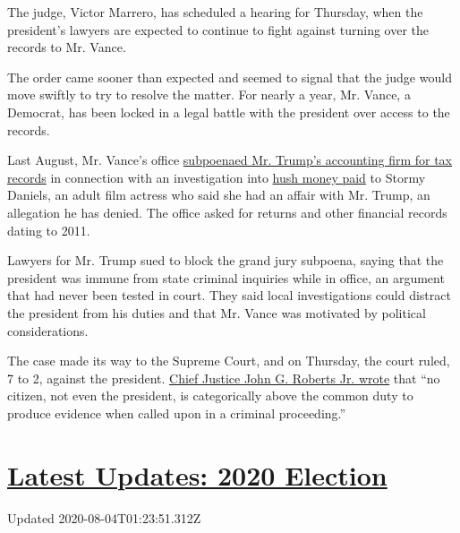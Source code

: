 The judge, Victor Marrero, has scheduled a hearing for Thursday, when
the president's lawyers are expected to continue to fight against
turning over the records to Mr. Vance.

The order came sooner than expected and seemed to signal that the judge
would move swiftly to try to resolve the matter. For nearly a year, Mr.
Vance, a Democrat, has been locked in a legal battle with the president
over access to the records.

Last August, Mr. Vance's office
\href{https://www.nytimes3xbfgragh.onion/2020/08/03/nyregion/donald-trump-taxes-cyrus-vance.html}{subpoenaed
Mr. Trump's accounting firm for tax records} in connection with an
investigation into
\href{https://www.nytimes3xbfgragh.onion/2019/08/01/nyregion/trump-cohen-stormy-daniels-vance.html}{hush
money paid} to Stormy Daniels, an adult film actress who said she had an
affair with Mr. Trump, an allegation he has denied. The office asked for
returns and other financial records dating to 2011.

Lawyers for Mr. Trump sued to block the grand jury subpoena, saying that
the president was immune from state criminal inquiries while in office,
an argument that had never been tested in court. They said local
investigations could distract the president from his duties and that Mr.
Vance was motivated by political considerations.

The case made its way to the Supreme Court, and on Thursday, the court
ruled, 7 to 2, against the president.
\href{https://www.supremecourt.gov/opinions/19pdf/19-635_o7jq.pdf}{Chief
Justice John G. Roberts Jr. wrote} that ``no citizen, not even the
president, is categorically above the common duty to produce evidence
when called upon in a criminal proceeding.''

\hypertarget{latest-updates-2020-election}{%
\section{\texorpdfstring{\href{https://www.nytimes3xbfgragh.onion/2020/08/03/us/elections/biden-vs-trump.html?action=click\&pgtype=Article\&state=default\&region=MAIN_CONTENT_1\&context=storylines_live_updates}{Latest
Updates: 2020
Election}}{Latest Updates: 2020 Election}}\label{latest-updates-2020-election}}

Updated 2020-08-04T01:23:51.312Z

